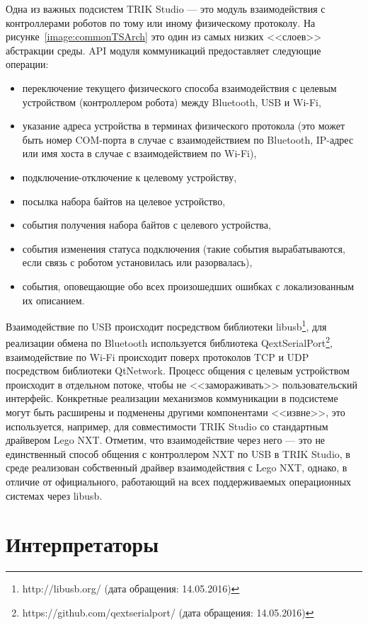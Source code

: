 \documentclass[a5paper]{article}
\begin{document}
Одна из важных подсистем TRIK Studio --- это модуль взаимодействия с контроллерами роботов по тому или иному физическому протоколу. На рисунке~\ref{image:commonTSArch} это один из самых низких <<слоев>> абстракции среды. API модуля коммуникаций предоставляет следующие операции:

\begin{itemize}
    \item переключение текущего физического способа взаимодействия с целевым устройством (контроллером робота) между Bluetooth, USB и Wi-Fi,
    \item указание адреса устройства в терминах физического протокола (это может быть номер COM-порта в случае с взаимодействием по Bluetooth, IP-адрес или имя хоста в случае с взаимодействием по Wi-Fi),
    \item подключение-отключение к целевому устройству,
    \item посылка набора байтов на целевое устройство,
    \item события получения набора байтов с целевого устройства,
    \item события изменения статуса подключения (такие события вырабатываются, если связь с роботом установилась или разорвалась),
    \item события, оповещающие обо всех произошедших ошибках с локализованным их описанием.
\end{itemize}

Взаимодействие по USB происходит посредством библиотеки libusb\footnote{http://libusb.org/ (дата обращения: 14.05.2016)}, для реализации обмена по Bluetooth используется библиотека QextSerialPort\footnote{https://github.com/qextserialport/ (дата обращения: 14.05.2016)}, взаимодействие по Wi-Fi происходит поверх протоколов TCP и UDP посредством библиотеки QtNetwork. Процесс общения с целевым устройством происходит в отдельном потоке, чтобы не <<замораживать>> пользовательский интерфейс. Конкретные реализации механизмов коммуникации в подсистеме могут быть расширены и подменены другими компонентами <<извне>>, это используется, например, для совместимости TRIK Studio со стандартным драйвером Lego NXT. Отметим, что взаимодействие через него --- это не единственный способ общения с контроллером NXT по USB в TRIK Studio, в среде реализован собственный драйвер взаимодействия с Lego NXT, однако, в отличие от официального, работающий на всех поддерживаемых операционных системах через libusb.

\section{Интерпретаторы}
\label{chapter:interpreters}
\end{document}
